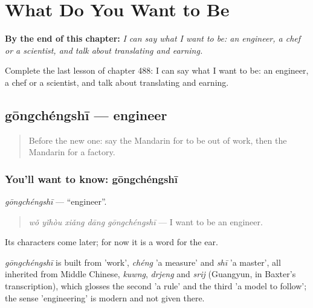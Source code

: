 
\chapter{What Do You Want to Be}
\label{ch:zh-what-do-you-want-to-be}

\begin{chapteropening}
\textbf{By the end of this chapter:} \emph{I can say what I want to be: an engineer, a chef or a scientist, and talk about translating and earning.}

Complete the last lesson of chapter 488: I can say what I want to be: an engineer, a chef or a scientist, and talk about translating and earning.
\end{chapteropening}

\section[gōngchéngshī]{gōngchéngshī — engineer}

\label{lesson:ZH-C488-gongchengshi}



\begin{quote}
Before the new one: say the Mandarin for to be out of work, then the Mandarin for a factory.
\end{quote}

\subsection*{You'll want to know: gōngchéngshī}
\emph{gōngchéngshī} — \textquotedblleft{}engineer\textquotedblright{}.

\begin{quote}
\emph{wǒ yǐhòu xiǎng dāng gōngchéngshī} — I want to be an engineer.
\end{quote}

Its characters come later; for now it is a word for the ear.

\begin{cousinweb}
\emph{gōngchéngshī} is built from  'work', \emph{chéng} 'a measure' and \emph{shī} 'a master', all inherited from Middle Chinese, \emph{kuwng}, \emph{drjeng} and \emph{srij} (Guangyun, in Baxter's transcription), which glosses the second 'a rule' and the third 'a model to follow'; the sense 'engineering' is modern and not given there.
\end{cousinweb}

